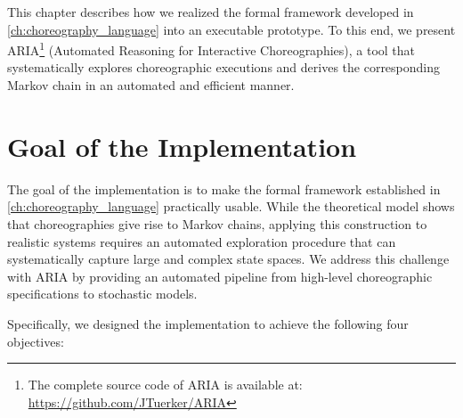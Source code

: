 This chapter describes how we realized the formal framework developed in \cref{ch:choreography_language} into an executable prototype. To this end, we present \textsc{ARIA}\footnote{The complete source code of \textsc{ARIA} is available at: \url{https://github.com/JTuerker/ARIA}} (Automated Reasoning for Interactive Choreographies), a tool that systematically explores choreographic executions and derives the corresponding Markov chain in an automated and efficient manner.

\section{Goal of the Implementation}
The goal of the implementation is to make the formal framework established in \cref{ch:choreography_language} practically usable. While the theoretical model shows that choreographies give rise to Markov chains, applying this construction to realistic systems requires an automated exploration procedure that can systematically capture large and complex state spaces.
We address this challenge with \textsc{ARIA} by providing an automated pipeline from high-level choreographic specifications to stochastic models.

Specifically, we designed the implementation to achieve the following four objectives:

